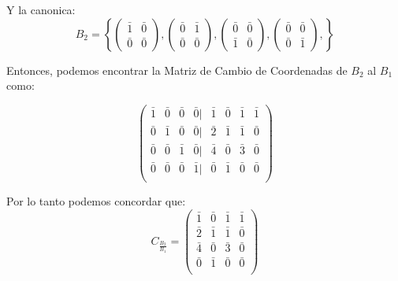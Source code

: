 \documentclass[12pt]{report}							    %
\begin{document}
        Y la canonica:
        \begin{equation*}
            B_2 = \left\{
                \begin{pmatrix}\bar{1}&\bar{0}\\\bar{0}&\bar{0}\end{pmatrix},
                \begin{pmatrix}\bar{0}&\bar{1}\\\bar{0}&\bar{0}\end{pmatrix},
                \begin{pmatrix}\bar{0}&\bar{0}\\\bar{1}&\bar{0}\end{pmatrix},
                \begin{pmatrix}\bar{0}&\bar{0}\\\bar{0}&\bar{1}\end{pmatrix},
            \right\}
        \end{equation*}

        Entonces, podemos encontrar la Matriz de Cambio de Coordenadas de $B_2$ al $B_1$ como:


        \begin{equation*}
            \begin{pmatrix}
                \bar{1} & \bar{0} & \bar{0} & \bar{0} | & \bar{1} & \bar{0} & \bar{1} & \bar{1} \\
                \bar{0} & \bar{1} & \bar{0} & \bar{0} | & \bar{2} & \bar{1} & \bar{1} & \bar{0} \\
                \bar{0} & \bar{0} & \bar{1} & \bar{0} | & \bar{4} & \bar{0} & \bar{3} & \bar{0} \\
                \bar{0} & \bar{0} & \bar{0} & \bar{1} | & \bar{0} & \bar{1} & \bar{0} & \bar{0} \\
            \end{pmatrix}
        \end{equation*}

        Por lo tanto podemos concordar que:
        \begin{equation*}
            C_{\frac{B_2}{B_1}} = 
            \begin{pmatrix}
                \bar{1} & \bar{0} & \bar{1} & \bar{1} \\
                \bar{2} & \bar{1} & \bar{1} & \bar{0} \\
                \bar{4} & \bar{0} & \bar{3} & \bar{0} \\
                \bar{0} & \bar{1} & \bar{0} & \bar{0} \\
            \end{pmatrix}
        \end{equation*}
\end{document}

